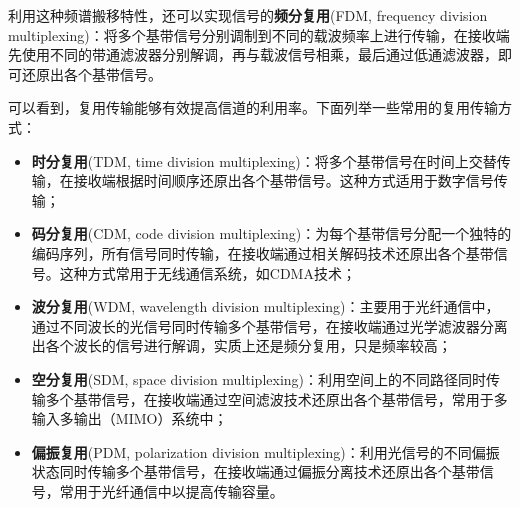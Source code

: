 利用这种频谱搬移特性，还可以实现信号的\textbf{频分复用}(FDM, frequency division multiplexing)：将多个基带信号分别调制到不同的载波频率上进行传输，在接收端先使用不同的带通滤波器分别解调，再与载波信号相乘，最后通过低通滤波器，即可还原出各个基带信号。

可以看到，复用传输能够有效提高信道的利用率。下面列举一些常用的复用传输方式：\begin{itemize}
    \item \textbf{时分复用}(TDM, time division multiplexing)：将多个基带信号在时间上交替传输，在接收端根据时间顺序还原出各个基带信号。这种方式适用于数字信号传输；
    \item \textbf{码分复用}(CDM, code division multiplexing)：为每个基带信号分配一个独特的编码序列，所有信号同时传输，在接收端通过相关解码技术还原出各个基带信号。这种方式常用于无线通信系统，如CDMA技术；
    \item \textbf{波分复用}(WDM, wavelength division multiplexing)：主要用于光纤通信中，通过不同波长的光信号同时传输多个基带信号，在接收端通过光学滤波器分离出各个波长的信号进行解调，实质上还是频分复用，只是频率较高；
    \item \textbf{空分复用}(SDM, space division multiplexing)：利用空间上的不同路径同时传输多个基带信号，在接收端通过空间滤波技术还原出各个基带信号，常用于多输入多输出（MIMO）系统中；
    \item \textbf{偏振复用}(PDM, polarization division multiplexing)：利用光信号的不同偏振状态同时传输多个基带信号，在接收端通过偏振分离技术还原出各个基带信号，常用于光纤通信中以提高传输容量。
\end{itemize}
